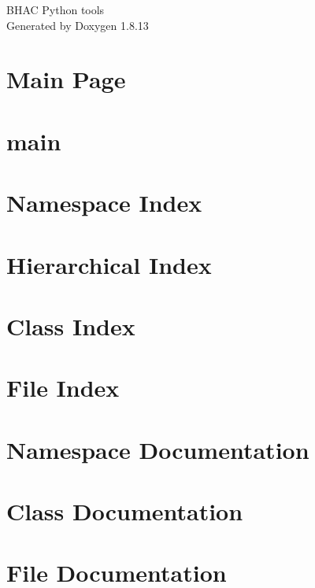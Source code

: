 \documentclass[twoside]{book}
\newcommand{\+}{\discretionary{\mbox{\scriptsize$\hookleftarrow$}}{}{}}
\newcommand{\clearemptydoublepage}{%
  \newpage{\pagestyle{empty}\cleardoublepage}%
}
\begin{document}
\hypersetup{pageanchor=false,
             bookmarksnumbered=true,
             pdfencoding=unicode
            }
\begin{titlepage}
\vspace*{7cm}
\begin{center}%
{\Large B\+H\+AC Python tools }\\
\vspace*{1cm}
{\large Generated by Doxygen 1.8.13}\\
\end{center}
\end{titlepage}
\clearemptydoublepage
{}
\tableofcontents
\clearemptydoublepage
{}
\hypersetup{pageanchor=true}

\chapter{Main Page}
\label{index}\hypertarget{index}{}
\chapter{main}
\label{md_main}

\chapter{Namespace Index}

\chapter{Hierarchical Index}

\chapter{Class Index}

\chapter{File Index}

\chapter{Namespace Documentation}


\chapter{Class Documentation}








\chapter{File Documentation}




\backmatter
\newpage
{}
\clearemptydoublepage
{}
\printindex
\end{document}
